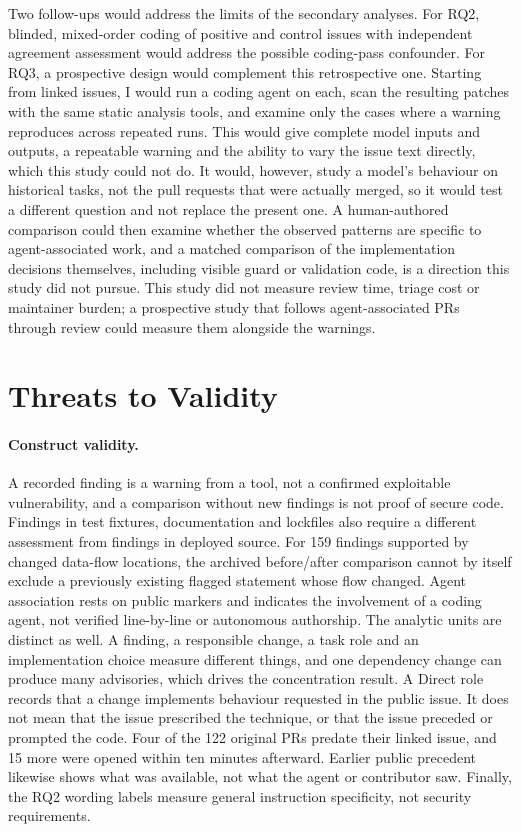 \documentclass[acmsmall,screen,nonacm,review]{acmart}
\begin{document}
Two follow-ups would address the limits of the secondary analyses. For RQ2, blinded, mixed-order coding of positive and control issues with independent agreement assessment would address the possible coding-pass confounder. For RQ3, a prospective design would complement this retrospective one. Starting from linked issues, I would run a coding agent on each, scan the resulting patches with the same static analysis tools, and examine only the cases where a warning reproduces across repeated runs. This would give complete model inputs and outputs, a repeatable warning and the ability to vary the issue text directly, which this study could not do. It would, however, study a model's behaviour on historical tasks, not the pull requests that were actually merged, so it would test a different question and not replace the present one. A human-authored comparison could then examine whether the observed patterns are specific to agent-associated work, and a matched comparison of the implementation decisions themselves, including visible guard or validation code, is a direction this study did not pursue. This study did not measure review time, triage cost or maintainer burden; a prospective study that follows agent-associated PRs through review could measure them alongside the warnings.

\section{Threats to Validity}
\enlargethispage{2\baselineskip}\label{sec:threats}

\paragraph{Construct validity.} A recorded finding is a warning from a tool, not a confirmed exploitable vulnerability, and a comparison without new findings is not proof of secure code. Findings in test fixtures, documentation and lockfiles also require a different assessment from findings in deployed source. For 159 findings supported by changed data-flow locations, the archived before/after comparison cannot by itself exclude a previously existing flagged statement whose flow changed. Agent association rests on public markers and indicates the involvement of a coding agent, not verified line-by-line or autonomous authorship. The analytic units are distinct as well. A finding, a responsible change, a task role and an implementation choice measure different things, and one dependency change can produce many advisories, which drives the concentration result. A Direct role records that a change implements behaviour requested in the public issue. It does not mean that the issue prescribed the technique, or that the issue preceded or prompted the code. Four of the 122 original PRs predate their linked issue, and 15 more were opened within ten minutes afterward. Earlier public precedent likewise shows what was available, not what the agent or contributor saw. Finally, the RQ2 wording labels measure general instruction specificity, not security requirements.
\end{document}
